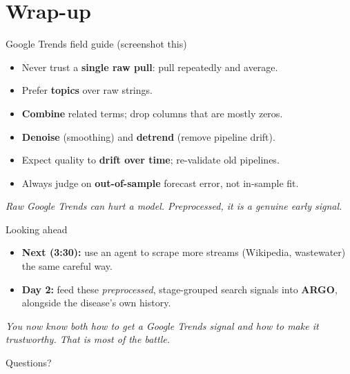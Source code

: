 \documentclass[aspectratio=169,11pt]{beamer}
\begin{document}
\section{Wrap-up}

\begin{frame}{Google Trends field guide (screenshot this)}
  \begin{itemize}
    \item Never trust a \textbf{single raw pull}: pull repeatedly and average.
    \item Prefer \textbf{topics} over raw strings.
    \item \textbf{Combine} related terms; drop columns that are mostly zeros.
    \item \textbf{Denoise} (smoothing) and \textbf{detrend} (remove pipeline drift).
    \item Expect quality to \textbf{drift over time}; re-validate old pipelines.
    \item Always judge on \textbf{out-of-sample} forecast error, not in-sample fit.
  \end{itemize}
  \vspace{0.3em}
  \begin{center}
    \itshape Raw Google Trends can hurt a model. Preprocessed, it is a genuine early signal.
  \end{center}
\end{frame}

\begin{frame}{Looking ahead}
  \begin{itemize}
    \item \textbf{Next (3:30):} use an agent to scrape more streams (Wikipedia, wastewater)
          the same careful way.
    \item \textbf{Day 2:} feed these \emph{preprocessed}, stage-grouped search signals into
          \textbf{ARGO}, alongside the disease's own history.
  \end{itemize}
  \vfill
  \begin{center}
    \itshape You now know both how to get a Google Trends signal and how to make it
    trustworthy. That is most of the battle.
  \end{center}
\end{frame}

\begin{frame}[standout]
  Questions?
\end{frame}
\end{document}
